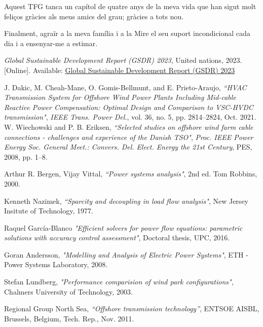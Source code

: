 \documentclass[a4paper,11pt, titlepage, twoside]{article}
\begin{document}
Aquest TFG tanca un capítol de quatre anys de la meva vida que han sigut molt feliços gràcies als meus amics del grau; gràcies a tots nou.\par 
Finalment, agraïr a la meva família i a la Mire el seu suport incondicional cada dia i a ensenyar-me a estimar.
 
 \begin{thebibliography}{99}\label{biblio}
 

 \textit{Global Sustainable Development Report (GSDR) 2023}, United nations, 2023. [Online]. 
 Available: \href{https://sdgs.un.org/gsdr/gsdr2023}{Global Sustainable Development Report (GSDR) 2023}
 
 {J. Dakic, M. Cheah-Mane, O. Gomis-Bellmunt, and E. Prieto-Araujo},
\textit{“HVAC Transmission System for Offshore Wind Power Plants Including
 Mid-cable Reactive Power Compensation: Optimal Design and Comparison to VSC-HVDC transmission"}, \textit{IEEE Trans. Power Del.}, vol. 36,
 no. 5, pp. 2814–2824, Oct. 2021.
 {W. Wiechowski and P. B. Eriksen},
\textit{“Selected studies on offshore wind farm
cable connections - challenges and experience of the Danish TSO"}, \textit{Proc.
IEEE Power Energy Soc. General Meet.: Convers. Del. Elect. Energy the
21st Century}, PES, 2008, pp. 1–8.

 {Arthur R. Bergen, Vijay Vittal},
\textit{“Power systems analysis"}, 2nd ed. Tom Robbins, 2000.

{Kenneth Nazimek},
\textit{“Sparcity and decoupling in load flow analysis"}, New Jersey Insitute of Technology, 1977.

{ Raquel García-Blanco}
\textit{"Efficient solvers for power flow equations: parametric solutions with accuracy control assessment"}, Doctoral thesis, UPC, 2016.


{Goran Andersson},
\textit{"Modelling and Analysis of Electric Power Systems"}, ETH - Power Systems Laboratory, 2008.

{Stefan Lundberg},
\textit{"Performance comparision of wind park configurations"}, Chalmers University of Technology, 2003.

{Regional Group North Sea},
\textit{“Offshore transmission technology”}, ENTSOE AISBL, Brussels, Belgium, Tech. Rep., Nov. 2011.



\end{thebibliography}
\end{document}
